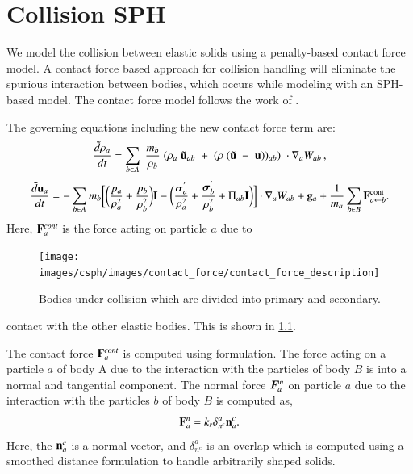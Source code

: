 \FloatBarrier%
\chapter{Collision SPH}
\label{chap:csph}

We model the collision between elastic solids using a penalty-based contact
force model. A contact force based approach for collision handling will
eliminate the spurious interaction between bodies, which occurs while modeling
with an SPH-based model. The contact force model follows the work of
\textcite{mohseni2021particle}.

The governing equations including the new contact force term are:
\begin{equation}
\label{eqn:sph-continuity}
  \frac{\tilde{d}\rho_a}{dt} = \sum_{b \in A} \; \frac{m_b}{\rho_{b}} \; (
  \rho_{a} \; \tilde{\mathbf{u}}_{ab} \; + \;
  (\rho \; (\tilde{\mathbf{u}} \; - \;
  \mathbf{u}))_{ab}) \; \cdot \nabla_{a} W_{ab}\, ,
\end{equation}
\begin{equation}
\label{eqn:sph-momentum}
  \frac{\tilde{d}\mathbf{u}_{a}}{dt} = - \sum_{b \in A} m_b \bigg[
  \bigg(\frac{p_a}{\rho_a^2} + \frac{p_b}{\rho_b^2}\bigg) \mathbf{I} -
  \bigg(\frac{\boldsymbol{\sigma}^{'}_{a}}{\rho_a^2} +
  \frac{\boldsymbol{\sigma}^{'}_{b}}{\rho_b^2} + \Pi_{ab} \mathbf{I} \bigg) \bigg]  \cdot \nabla_{a} W_{ab} +
  \mathbf{g}_{a} + \frac{1}{m_a}\sum_{b \in B} \mathbf{F}^{\text{cont}}_{a \leftarrow b}.
\end{equation}
Here, $\mathbf{F}^{cont}_{a}$ is the force acting on particle $a$ due to
\begin{figure}[!htpb]
  \centering
  \texttt{[image: images/csph/images/contact\_force/contact\_force\_description]}
  \caption{Bodies under collision which are divided into primary and
    secondary.}
\label{fig:bodies_under_collision}
\end{figure}
contact with the other elastic bodies. This is shown in \cref{fig:bodies_under_collision}.

The contact force $\mathbf{F}^{cont}_{a}$ is computed using
\textcite{mohseni2021particle} formulation. The force acting on a particle $a$
of body A due to the interaction with the particles of body $B$ is into a normal
and tangential component. The normal force $\boldsymbol{F}_a^{n}$ on particle $a$ due
to the interaction with the particles $b$ of body $B$ is computed as,
\begin{equation}
  \label{eq:contact-algorithm-normal}
  \mathbf{F}_a^n = k_r \delta_{n^{c}}^{a} \mathbf{n}_a^{c}.
\end{equation}
Here, the $\mathbf{n}_a^{c}$ is a normal vector, and
$\delta_{n^{c}}^{a}$ is an overlap which is computed using a smoothed distance
formulation to handle arbitrarily shaped solids.

